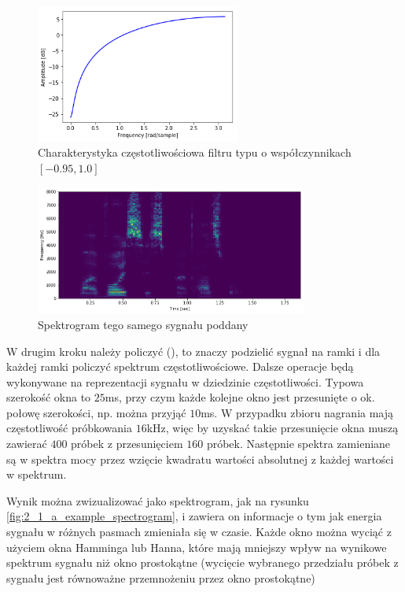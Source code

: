 \begin{figure}[H]
    \centering
    \includegraphics[width=0.6\textwidth]{images/2_1_c_preemphasis_response}
    \caption{Charakterystyka częstotliwościowa filtru typu  o współczynnikach $[-0.95, 1.0]$}
    \label{fig:2_1_c_preemphasis_response}
\end{figure}

\begin{figure}[H]
    \centering
    \includegraphics[width=0.8\textwidth]{images/2_1_b_example_preemphasis}
    \caption{Spektrogram tego samego sygnału poddany }
    \label{fig:2_1_b_example_preemphasis}
\end{figure}

W drugim kroku należy policzyć  (), to znaczy podzielić
sygnał na ramki i dla każdej ramki policzyć spektrum częstotliwościowe. Dalsze operacje
będą wykonywane na reprezentacji sygnału w dziedzinie częstotliwości. Typowa szerokość
okna to $25$ms, przy czym każde kolejne okno jest przesunięte o ok. połowę szerokości,
np. można przyjąć $10$ms. W przypadku zbioru  nagrania mają częstotliwość próbkowania $16$kHz,
więc by uzyskać takie przesunięcie okna muszą zawierać $400$ próbek z przesunięciem $160$ próbek.
Następnie spektra zamieniane są w spektra mocy przez wzięcie kwadratu wartości absolutnej
z każdej wartości w spektrum.

Wynik  można zwizualizować jako spektrogram, jak na rysunku \ref{fig:2_1_a_example_spectrogram},
i zawiera on informacje o tym jak energia sygnału w różnych pasmach zmieniała się w czasie.
Każde okno można wyciąć z użyciem okna Hamminga lub Hanna, które mają mniejszy wpływ
na wynikowe spektrum sygnału niż okno prostokątne (wycięcie wybranego przedziału próbek
z sygnału jest równoważne przemnożeniu przez okno prostokątne)

